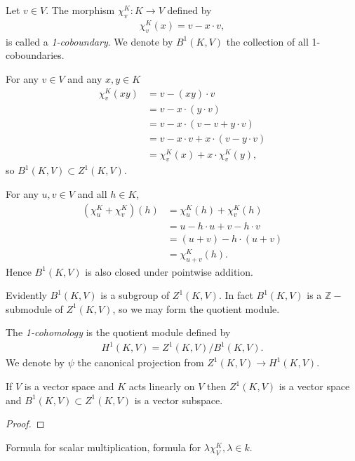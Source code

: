 \begin{definition} Let $v \in V$. The morphism $\chi^K_v:K\rightarrow V$ defined by
\begin{align*}
	\chi^K_v (x) = v - x\cdot v,
\end{align*}
is called a \emph{1-coboundary}. We denote by $B^1\left(K, V\right)$ the collection of all 1-coboundaries. 
\end{definition}

For any $v \in V$ and any $x, y \in K$
\begin{align*}
	\chi^K_v(xy) &=  v - (xy)\cdot v \\
	&=  v - x \cdot \left(y\cdot v \right)\\
	&=  v - x \cdot \left(v -v + y\cdot v \right)\\
	&=  v - x\cdot v + x\cdot \left( v - y\cdot v\right)\\
	&=  \chi^K_v(x) + x\cdot \chi^K_v(y),
\end{align*}
so $B^1(K, V) \subset Z^1(K, V)$. 

For any $u,v \in V$ and all $h \in K$,
\begin{align*}
	(\chi^K_u + \chi^K_v)(h) &=  \chi^K_u(h) + \chi^K_v(h)\\
	&=  u - h\cdot u + v - h\cdot v \\
	&=  (u + v) - h\cdot (u + v) \\
	&=  \chi^K_{u + v} (h).
\end{align*}
Hence $B^1\left(K, V\right)$ is also closed under pointwise addition.

Evidently $B^1(K, V)$ is a subgroup of $Z^1(K, V)$. In fact $B^1(K, V)$ is a $\mathbb{Z}-$submodule of $Z^1(K, V)$, so we may form the quotient module.
\begin{definition} The \emph{1-cohomology} is the quotient module defined by
\begin{align*}
	H^1\left(K, V\right) = Z^1\left(K, V\right) / B^1\left(K, V\right).
\end{align*}
We denote by $\psi$ the canonical projection from $Z^1(K, V)\rightarrow H^1(K, V)$.
\end{definition}

\begin{lemma} \label{vspace} If $V$ is a vector space and $K$ acts linearly on $V$ then $Z^1(K, V)$ is a vector space and $B^1(K, V)\subset Z^1(K, V)$ is a vector subspace.
\end{lemma}
\begin{proof}
\end{proof}
Formula for scalar multiplication, formula for $\lambda\chi^K_V, \lambda \in k$.

